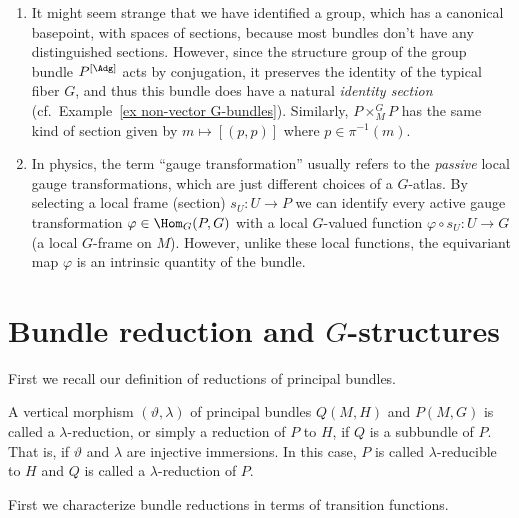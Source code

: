 \begin{rem}
    \begin{enumerate}
        \item It might seem strange that we have identified a group, which has a canonical basepoint, with spaces of sections, because most bundles don't have any distinguished sections. However, since the structure group of the group bundle $P^{[\Adg]}$ acts by conjugation, it preserves the identity of the typical fiber $G$, and thus this bundle does have a natural \emph{identity section} (cf.\ Example~\ref{ex non-vector G-bundles}).  Similarly, $P\times^G_MP$ has the same kind of section given by $m\mapsto [(p,p)]$ where $p\in \pi^{-1}(m)$.
        \item In physics, the term ``gauge transformation'' usually refers to the \emph{passive} local gauge transformations, which are just different choices of a $G$-atlas. By selecting a local frame (section) $s_U:U\to P$ we can identify every active gauge transformation $\varphi\in \Hom_G(P,G)$ with a local $G$-valued function $\varphi\circ s_U:U\to G$ (a local $G$-frame on $M$). However, unlike these local functions, the equivariant map $\varphi$ is an intrinsic quantity of the bundle.
    \end{enumerate}
\end{rem}





\section{Bundle reduction and \texorpdfstring{$G$}{G}-structures}\label{sec: bundle reduction}

First we recall our definition of reductions of principal bundles.

\begin{defn}
    A vertical morphism $(\vartheta,\lambda)$ of principal bundles $Q(M,H)$ and $P(M,G)$ is called a $\lambda$-reduction, or simply a reduction of $P$ to $H$, if $Q$ is a subbundle of $P$. That is, if $\vartheta$ and $\lambda$ are injective immersions. In this case, $P$ is called $\lambda$-reducible to $H$ and $Q$ is called a $\lambda$-reduction of $P$.
\end{defn}

First we characterize bundle reductions in terms of transition functions.

